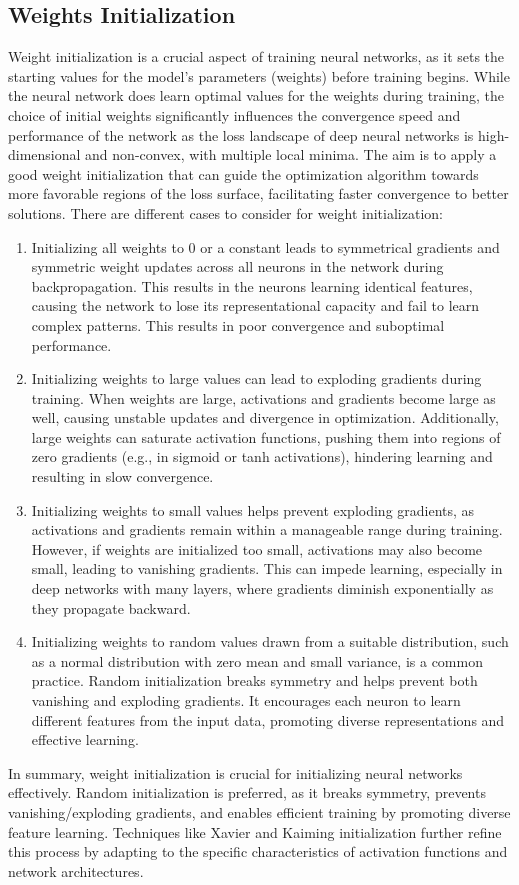\subsection{Weights Initialization}
Weight initialization is a crucial aspect of training neural networks, as it sets the starting values for the model's parameters (weights) before training begins. While the neural network does learn optimal values for the weights during training, the choice of initial weights significantly influences the convergence speed and performance of the network as the loss landscape of deep neural networks is high-dimensional and non-convex, with multiple local minima. The aim is to apply a good weight initialization that can guide the optimization algorithm towards more favorable regions of the loss surface, facilitating faster convergence to better solutions. There are different cases to consider for weight initialization: 
\begin{enumerate}
\item Initializing all weights to 0 or a constant leads to symmetrical gradients and symmetric weight updates across all neurons in the network during backpropagation. This results in the neurons learning identical features, causing the network to lose its representational capacity and fail to learn complex patterns. This results in poor convergence and suboptimal performance.
\item Initializing weights to large values can lead to exploding gradients during training. When weights are large, activations and gradients become large as well, causing unstable updates and divergence in optimization. Additionally, large weights can saturate activation functions, pushing them into regions of zero gradients (e.g., in sigmoid or tanh activations), hindering learning and resulting in slow convergence.
\item Initializing weights to small values helps prevent exploding gradients, as activations and gradients remain within a manageable range during training. However, if weights are initialized too small, activations may also become small, leading to vanishing gradients. This can impede learning, especially in deep networks with many layers, where gradients diminish exponentially as they propagate backward. 
\item Initializing weights to random values drawn from a suitable distribution, such as a normal distribution with zero mean and small variance, is a common practice. Random initialization breaks symmetry and helps prevent both vanishing and exploding gradients. It encourages each neuron to learn different features from the input data, promoting diverse representations and effective learning.
\end{enumerate}
In summary, weight initialization is crucial for initializing neural networks effectively. Random initialization is preferred, as it breaks symmetry, prevents vanishing/exploding gradients, and enables efficient training by promoting diverse feature learning. Techniques like Xavier and Kaiming initialization further refine this process by adapting to the specific characteristics of activation functions and network architectures.
